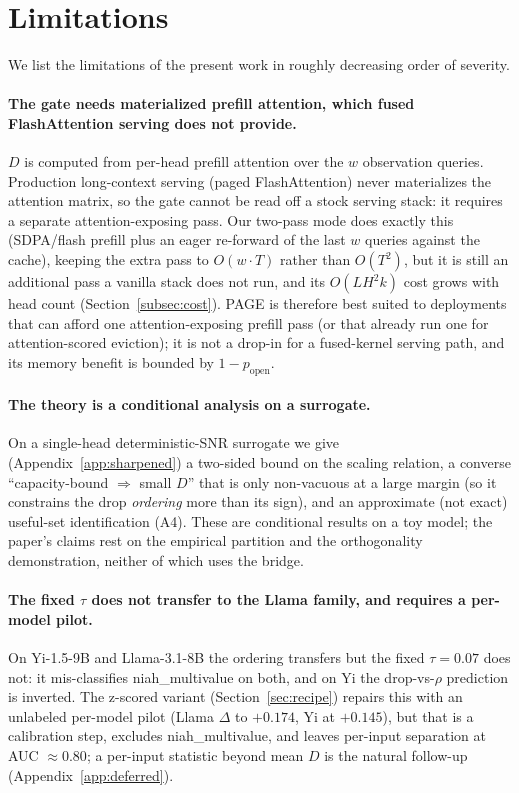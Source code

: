 \documentclass{article}
\newcommand{\method}{PAGE\xspace}
\begin{document}
\section{Limitations}
\label{sec:limitations}

We list the limitations of the present work in roughly decreasing
order of severity.

\paragraph{The gate needs materialized prefill attention, which fused
FlashAttention serving does not provide.} $D$ is computed from per-head prefill
attention over the $w$ observation queries. Production long-context serving
(paged FlashAttention) never materializes the attention matrix, so the gate
cannot be read off a stock serving stack: it requires a separate
attention-exposing pass. Our two-pass mode does exactly this (SDPA/flash prefill
plus an eager re-forward of the last $w$ queries against the cache), keeping the
extra pass to $O(w \cdot T)$ rather than $O(T^2)$, but it is still an additional
pass a vanilla stack does not run, and its $O(L H^2 k)$ cost grows with head
count (Section~\ref{subsec:cost}). \method is therefore best suited to
deployments that can afford one attention-exposing prefill pass (or that already
run one for attention-scored eviction); it is not a drop-in for a fused-kernel
serving path, and its memory benefit is bounded by $1 - p_{\text{open}}$.

\paragraph{The theory is a conditional analysis on a surrogate.} On a
single-head deterministic-SNR surrogate we give (Appendix~\ref{app:sharpened})
a two-sided bound on the scaling relation, a converse ``capacity-bound
$\Rightarrow$ small $D$'' that is only non-vacuous at a large margin (so it
constrains the drop \emph{ordering} more than its sign), and an approximate
(not exact) useful-set identification (A4). These are conditional results on a
toy model; the paper's claims rest on the empirical partition and the
orthogonality demonstration, neither of which uses the bridge.

\paragraph{The fixed $\tau$ does not transfer to the Llama family, and
requires a per-model pilot.} On Yi-1.5-9B and Llama-3.1-8B the ordering
transfers but the fixed $\tau = 0.07$ does not: it mis-classifies
niah\_multivalue on both, and on Yi the drop-vs-$\rho$ prediction is inverted.
The z-scored variant (Section~\ref{sec:recipe}) repairs this with an unlabeled
per-model pilot (Llama $\Delta$ to $+0.174$, Yi at $+0.145$), but that is a
calibration step, excludes niah\_multivalue, and leaves per-input separation at
AUC $\approx 0.80$; a per-input statistic beyond mean $D$ is the natural
follow-up (Appendix~\ref{app:deferred}).
\end{document}
